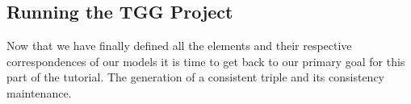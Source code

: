 {\clearpage

%
%
%
%
%
%
%
%
%
%
%
%
%
%
%

\subsection{Running the TGG Project}

Now that we have finally defined all the elements and their respective correspondences of our models it is time to get back to our primary goal for this part of the tutorial. The generation of a consistent triple and its consistency maintenance.\newline

}
